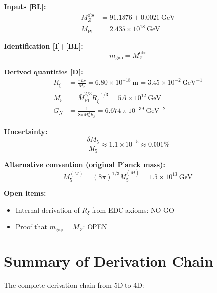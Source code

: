 \documentclass[11pt,a4paper]{article}
\newcommand{\Rxi}{R_\xi}
\newcommand{\Mplbar}{\bar{M}_{\mathrm{Pl}}}
\newcommand{\Mfive}{M_5}
\newcommand{\GN}{G_N}
\newcommand{\MZ}{M_Z}
\newcommand{\mgap}{m_{\mathrm{gap}}}
\begin{document}
\begin{tcolorbox}[title=BLOCK-003 Canonical Closure (Reviewer Packet), colback=green!10, colframe=green!50!black]

\textbf{Inputs [BL]:}
\begin{align}
\MZ^{\mathrm{obs}} &= 91.1876 \pm 0.0021~\mathrm{GeV} \\
\Mplbar &= 2.435 \times 10^{18}~\mathrm{GeV}
\end{align}

\textbf{Identification [I]+[BL]:}
\begin{equation}
\mgap = \MZ^{\mathrm{obs}}
\end{equation}

\textbf{Derived quantities [D]:}
\begin{align}
\Rxi &= \frac{\pi\hbar c}{\MZ} = 6.80 \times 10^{-18}~\mathrm{m} = 3.45 \times 10^{-2}~\mathrm{GeV}^{-1} \\
\Mfive &= \Mplbar^{2/3} \Rxi^{-1/3} = 5.6 \times 10^{12}~\mathrm{GeV} \\
\GN &= \frac{1}{8\pi\Mfive^3\Rxi} = 6.674 \times 10^{-39}~\mathrm{GeV}^{-2}
\end{align}

\textbf{Uncertainty:}
\begin{equation}
\frac{\delta\Mfive}{\Mfive} \approx 1.1 \times 10^{-5} \approx 0.001\%
\end{equation}

\textbf{Alternative convention (original Planck mass):}
\begin{equation}
\Mfive^{(M)} = (8\pi)^{1/3} \Mfive^{(\bar{M})} = 1.6 \times 10^{13}~\mathrm{GeV}
\end{equation}

\textbf{Open items:}
\begin{itemize}
\item Internal derivation of $\Rxi$ from EDC axioms: NO-GO
\item Proof that $\mgap = \MZ$: OPEN
\end{itemize}
\end{tcolorbox}

\section{Summary of Derivation Chain}

The complete derivation chain from 5D to 4D:
\end{document}
